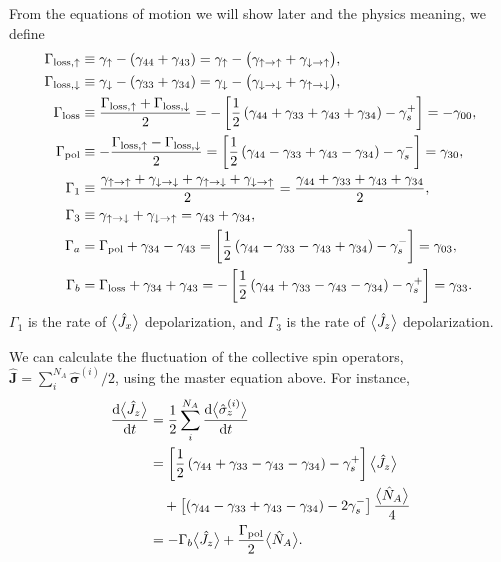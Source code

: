 From the equations of motion we will show later and the physics meaning, we define
\begin{align}
\Gamma_{\rm{loss},\uparrow} &\equiv \gamma_\uparrow - (\gamma_{44}+\gamma_{43})=\gamma_\uparrow - \big(\gamma_{\uparrow \rightarrow \uparrow} + \gamma_{\downarrow \rightarrow \uparrow} \big), \\
\Gamma_{\rm{loss},\downarrow} &\equiv \gamma_\downarrow - (\gamma_{33}+\gamma_{34})=\gamma_\downarrow - \big(\gamma_{\downarrow \rightarrow \downarrow} + \gamma_{\uparrow \rightarrow \downarrow} \big),\\
\Gamma_{\rm loss} &\equiv \frac{\Gamma_{\rm{loss},\uparrow} +\Gamma_{\rm{loss},\downarrow}}{2}=-\left[\frac{1}{2}\left(\gamma_{44}+\gamma_{33}+\gamma_{43}+\gamma_{34} \right)-\gamma_s^+\right]=-\gamma_{00}, \\
\Gamma_{\rm pol} &\equiv -\frac{\Gamma_{\rm{loss},\uparrow} - \Gamma_{\rm{loss},\downarrow}}{2}=\left[\frac{1}{2}\left(\gamma_{44}-\gamma_{33}+\gamma_{43}-\gamma_{34}\right) -\gamma_s^-\right]=\gamma_{30},\\
\Gamma_1 &\equiv \frac{\gamma_{\uparrow \rightarrow \uparrow} + \gamma_{\downarrow \rightarrow \downarrow} + \gamma_{\uparrow \rightarrow \downarrow} + \gamma_{\downarrow \rightarrow \uparrow}}{2}=\frac{\gamma_{44}+\gamma_{33}+\gamma_{43}+\gamma_{34}}{2},\\
\Gamma_3 &\equiv \gamma_{\uparrow \rightarrow \downarrow}+\gamma_{\downarrow \rightarrow \uparrow}=\gamma_{43}+\gamma_{34},\\
\Gamma_a &= \Gamma_{\rm pol}+\gamma_{34}-\gamma_{43}= \left[\frac{1}{2}\left(\gamma_{44}-\gamma_{33}-\gamma_{43}+\gamma_{34}\right) -\gamma_s^-\right]=\gamma_{03},\\
\Gamma_b &= \Gamma_{\rm loss}+\gamma_{34}+\gamma_{43}=-\left[\frac{1}{2}\left(\gamma_{44}+\gamma_{33}-\gamma_{43}-\gamma_{34} \right)-\gamma_s^+\right]=\gamma_{33} .
\end{align}
$ \Gamma_1 $ is the rate of $ \big\langle \hat{J}_x \big\rangle $ depolarization, and $ \Gamma_3 $ is the rate of $ \big\langle \hat{J}_z \big\rangle $ depolarization. 

We can calculate the fluctuation of the collective spin operators, $ \hat{\mathbf{J}}=\sum_i^{N_A}\hat{\boldsymbol{\sigma}}^{(i)}/2 $, using the master equation above. 
For instance, 
\begin{align}
\dt{\expect{\hat{J}_z}} &= \frac{1}{2}\sum_i^{N_A} \dt{\expect{\hat{\sigma}_z^{(i)}}}\\
&= \left[\frac{1}{2}\left(\gamma_{44}+\gamma_{33}-\gamma_{43}-\gamma_{34} \right)-\gamma_s^+\right]\expect{\hat{J}_z} \nonumber \\
&\quad + \left[\left(\gamma_{44} -\gamma_{33}+\gamma_{43}-\gamma_{34}\right)- 2\gamma_s^-\right] \frac{\expect{\hat{N}_A}}{4}\\
&= -\Gamma_b \expect{\hat{J}_z} +\frac{\Gamma_{\rm pol}}{2}\expect{\hat{N}_A}.\label{eq:expJzeq}
\end{align}

